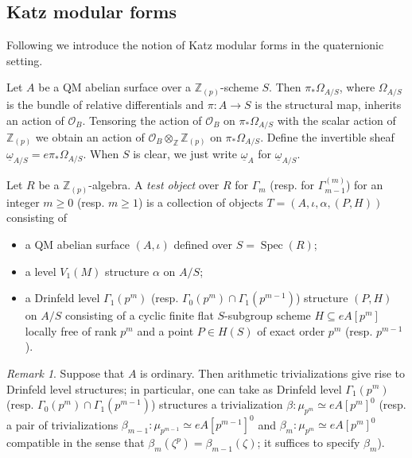 \documentclass[a4paper,11pt]{amsart}
\numberwithin{equation}{section}
\theoremstyle{plain}
\theoremstyle{definition}
\theoremstyle{remark}
\newtheorem{remark}[theorem]{Remark}
\newcommand{\Z}{\mathbb{Z}}
\DeclareMathOperator{\Spec}{Spec}
\begin{document}
\subsection{Katz modular forms}\label{KatzMF}
{Following \cite{Brasca, Brooks} we introduce the notion of Katz modular forms in the quaternionic setting.

Let $A$ be a QM abelian surface over a $\Z_{(p)}$-scheme $S$. Then $\pi_* \Omega_{A/S}$, where $\Omega_{A/S}$ is the bundle of relative differentials and $\pi:A\rightarrow S$ is the structural map, inherits an action of $\mathcal{O}_B$. Tensoring the action of $\mathcal{O}_B$ on $\pi_* \Omega_{A/S}$ with the scalar action of $\Z_{(p)}$ we obtain an action of $\mathcal{O}_{B}\otimes_\Z\Z_{(p)}$ on $\pi_* \Omega_{A/S}$. Define the invertible sheaf $\underline{\omega}_{A/S}=e\pi_* \Omega_{A/S}$. When $S$ is clear, we just write $\underline{\omega}_A$ for $\underline{\omega}_{A/S}$. 

Let $R$ be a $\Z_{(p)}$-algebra. A \emph{test object} over $R$ for $\Gamma_m$ (resp. for $\Gamma_{m-1}^{(m)}$) for an integer $m\geq 0$ (resp. $m\ge 1$) is a collection of objects $T=(A, \iota,\alpha,(P,H))$ consisting of
\begin{itemize}
\item a QM abelian surface $(A,\iota)$ defined over $S=\Spec(R)$;
\item a level $V_1(M)$ structure $\alpha$ on $A/S$;
\item a Drinfeld level $\Gamma_1(p^m)$ (resp. $\Gamma_0(p^{m})\cap\Gamma_1(p^{m-1})$) structure $(P,H)$ on $A/S$ consisting of a cyclic finite flat $S$-subgroup scheme $H\subseteq eA[p^m]$ locally free of rank $p^m$ and a point $P\in H(S)$ of exact order $p^m$ (resp. $p^{m-1}$).
\end{itemize}

\begin{remark} 
Suppose that $A$ is ordinary. Then arithmetic trivializations give rise to Drinfeld level structures; in particular, one can take as Drinfeld level $\Gamma_1(p^m)$ (resp. $\Gamma_0(p^{m})\cap\Gamma_1(p^{m-1})$)  structures a trivialization $\beta\colon \mu_{p^m}\simeq eA[p^m]^0$ (resp. a pair of trivializations $\beta_{m-1}\colon \mu_{p^{m-1}}\simeq eA[p^{m-1}]^0$ and $\beta_m\colon\mu_{p^m}\simeq eA[p^m]^0$ compatible in the sense that $\beta_m(\zeta^p)=\beta_{m-1}(\zeta)$; it suffices to specify $\beta_m$).\end{remark}

}
\end{document}

